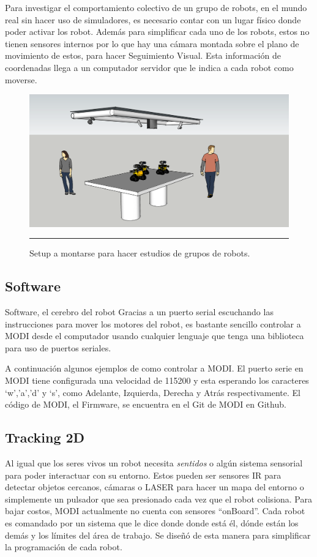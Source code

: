 Para investigar el comportamiento colectivo de un grupo de robots, en el mundo real sin hacer uso de simuladores, es necesario contar con un lugar físico donde poder activar los robot. Además para simplificar cada uno de los robots, estos no tienen sensores internos por lo que hay una cámara montada sobre el plano de movimiento de estos, para hacer Seguimiento Visual. Esta información de coordenadas llega a un computador servidor que le indica a cada robot como moverse.
\begin{figure}[htbp]
	\centering
		\includegraphics[width=\textwidth]{./Figures/setup.png}
		\rule{35em}{0.5pt}
	\caption[Setup Enjambre MODI]{Setup a montarse para hacer estudios de grupos de robots.}
	\label{fig:setup}
\end{figure}

\subsection{Software}
Software, el cerebro del robot
Gracias a un puerto serial escuchando las instrucciones para mover los motores del robot, es bastante sencillo controlar a MODI desde el computador usando cualquier lenguaje que tenga una biblioteca para uso de puertos seriales.

A continuación algunos ejemplos de como controlar a MODI. El puerto serie en MODI tiene configurada una velocidad de 115200 y esta esperando los caracteres ‘w’,’a’,’d’ y ‘s’, como Adelante, Izquierda, Derecha y Atrás respectivamente. El código de MODI, el Firmware, se encuentra en el Git de MODI en Github.


\subsection{Tracking 2D}
Al igual que los seres vivos un robot necesita \textit{sentidos} o algún sistema sensorial para poder interactuar con su entorno. Estos pueden ser sensores IR para detectar objetos cercanos, cámaras o LASER para hacer un mapa del entorno o simplemente un pulsador que sea presionado cada vez que el robot colisiona. Para bajar costos, MODI actualmente no cuenta con sensores “onBoard”. Cada robot es comandado por un sistema que le dice donde donde está él, dónde están los demás y los límites del área de trabajo. Se diseñó de esta manera para simplificar la programación de cada robot.

